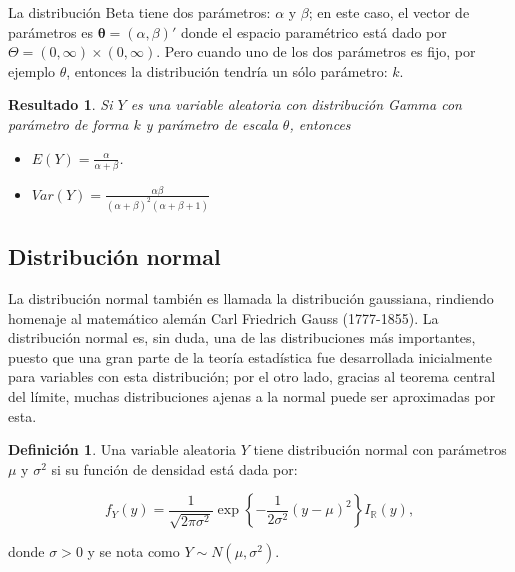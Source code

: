 \documentclass[
  10pt,
  spanish,
]{book}
\providecommand{\tightlist}{%
  \setlength{\itemsep}{0pt}\setlength{\parskip}{0pt}}
\newtheorem{proposition}{Resultado}[chapter]
\theoremstyle{definition}
\newtheorem{definition}{Definición}[chapter]
\theoremstyle{definition}
\theoremstyle{definition}
\theoremstyle{definition}
\theoremstyle{remark}
\begin{document}
La distribución Beta tiene dos parámetros: \(\alpha\) y \(\beta\); en este caso, el vector de parámetros es \(\boldsymbol \theta=(\alpha,\beta)'\) donde el espacio paramétrico está dado por \(\Theta=(0,\infty)\times(0,\infty)\). Pero cuando uno de los dos parámetros es fijo, por ejemplo \(\theta\), entonces la distribución tendría un sólo parámetro: \(k\).

\begin{proposition}
\protect\hypertarget{prp:unnamed-chunk-31}{}{\label{prp:unnamed-chunk-31} }Si \(Y\) es una variable aleatoria con distribución Gamma con parámetro de forma \(k\) y parámetro de escala \(\theta\), entonces

\begin{itemize}
\tightlist
\item
  \(E(Y)=\frac{\alpha}{\alpha + \beta}\).
\item
  \(Var(Y)=\frac{\alpha\beta}{(\alpha+\beta)^2(\alpha+\beta+1)}\)
\end{itemize}
\end{proposition}

\hypertarget{distribuciuxf3n-normal}{%
\subsection{Distribución normal}\label{distribuciuxf3n-normal}}

La distribución normal también es llamada la distribución gaussiana, rindiendo homenaje al matemático alemán Carl Friedrich Gauss (1777-1855). La distribución normal es, sin duda, una de las distribuciones más importantes, puesto que una gran parte de la teoría estadística fue desarrollada inicialmente para variables con esta distribución; por el otro lado, gracias al teorema central del límite, muchas distribuciones ajenas a la normal puede ser aproximadas por esta.

\begin{definition}
\protect\hypertarget{def:unnamed-chunk-32}{}{\label{def:unnamed-chunk-32} }Una variable aleatoria \(Y\) tiene distribución normal con parámetros \(\mu\) y \(\sigma^2\) si su función de densidad está dada por:

\begin{equation}
f_Y(y)=\frac{1}{\sqrt{2\pi\sigma^2}}\exp\left\{-\frac{1}{2\sigma^2}(y-\mu)^2\right\}I_\mathbb{R}(y),
\end{equation}

donde \(\sigma>0\) y se nota como \(Y\sim N(\mu,\sigma^2)\).
\end{definition}
\end{document}
